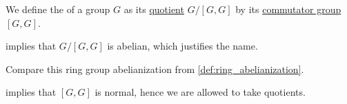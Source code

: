 \begin{definition}\label{def:group_abelianization}
   We define the  of a group \( G \) as its \hyperref[def:group/quotient]{quotient} \( G / [G, G] \) by its \hyperref[def:group_commutator]{commutator group} \( [G, G] \).
\end{definition}
\begin{comments}
  \item {} implies that \( G / [G, G] \) is abelian, which justifies the name.
  \item Compare this ring group abelianization from \cref{def:ring_abelianization}.
\end{comments}
\begin{defproof}
   implies that \( [G, G] \) is normal, hence we are allowed to take quotients.
\end{defproof}

